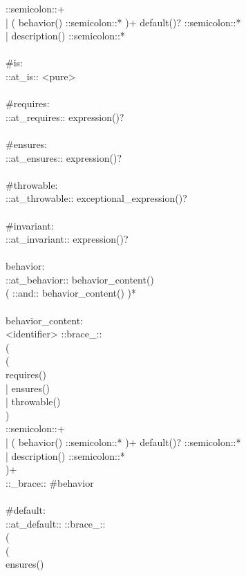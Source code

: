 \begin{bigbigpre}
    ::semicolon::+ \\
  | ( behavior() ::semicolon::* )+ default()? ::semicolon::* \\
  | description() ::semicolon::* \\
 \\
#is: \\
    ::at_is:: <pure> \\
 \\
#requires: \\
    ::at_requires:: expression()? \\
 \\
#ensures: \\
    ::at_ensures:: expression()? \\
 \\
#throwable: \\
    ::at_throwable:: exceptional_expression()? \\
 \\
#invariant: \\
    ::at_invariant:: expression()? \\
 \\
behavior: \\
    ::at_behavior:: behavior_content() \\
    ( ::and:: behavior_content() )* \\
 \\
behavior_content: \\
    <identifier> ::brace_:: \\
    ( \\
        ( \\
            requires() \\
          | ensures() \\
          | throwable() \\
        ) \\
        ::semicolon::+ \\
      | ( behavior() ::semicolon::* )+ default()? ::semicolon::* \\
      | description() ::semicolon::* \\
    )+ \\
    ::_brace:: #behavior \\
 \\
#default: \\
    ::at_default:: ::brace_:: \\
    ( \\
        ( \\
            ensures() \\

\end{bigbigpre}
